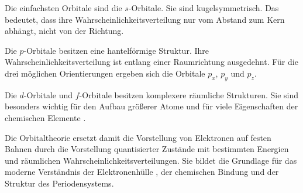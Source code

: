 Die einfachsten Orbitale sind die \(s\)-Orbitale. Sie sind
kugelsymmetrisch. Das bedeutet, dass ihre Wahrscheinlichkeitsverteilung nur vom
Abstand zum Kern abhängt, nicht von der Richtung.

Die \(p\)-Orbitale besitzen eine hantelförmige Struktur. Ihre
Wahrscheinlichkeitsverteilung ist entlang einer Raumrichtung ausgedehnt. Für
die drei möglichen Orientierungen ergeben sich die Orbitale \(p_x\), \(p_y\)
und \(p_z\).

Die \(d\)-Orbitale und \(f\)-Orbitale besitzen
komplexere räumliche Strukturen. Sie sind besonders wichtig für den Aufbau
größerer Atome und für viele Eigenschaften der chemischen Elemente
.

Die Orbitaltheorie ersetzt damit die Vorstellung von
Elektronen auf festen Bahnen durch die Vorstellung quantisierter Zustände mit
bestimmten Energien und räumlichen Wahrscheinlichkeitsverteilungen. Sie bildet
die Grundlage für das moderne Verständnis der Elektronenhülle
, der chemischen Bindung und
der Struktur des Periodensystems.